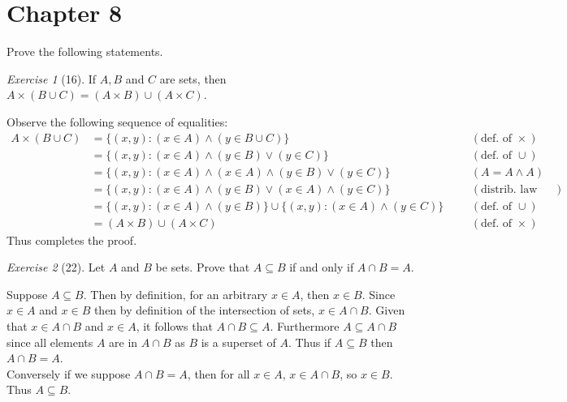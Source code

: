 \documentclass[12pt]{amsart}
\makeatletter
\theoremstyle{remark}
\newtheorem*{exercise}{Exercise}%
\renewenvironment{proof}[1][\proofname]{\par\doublespacing
  \pushQED{\qed}%
  \normalfont \topsep6\p@\@plus6\p@\relax
  \list{}{%
    \settowidth{\leftmargin}{\itshape\proofname:\hskip\labelsep}%
    \setlength{\labelwidth}{0pt}%
    \setlength{\itemindent}{-\leftmargin}%
  }%
  \item[\hskip\labelsep\itshape#1\@addpunct{:}]\ignorespaces
}{%
  \popQED\endlist\@endpefalse
  \singlespacing
}
\theoremstyle{mycomment}
\makeatother
\begin{document}
\thispagestyle{fancy}

\section*{Chapter 8} Prove the following statements.
\begin{exercise}[16] If $A,B$ and $C$ are sets, then $A\times (B\cup C)=(A\times B)\cup (A\times C)$.
\begin{proof} Observe the following sequence of equalities:
  \begin{align*}
    A \times (B \cup C) & = \{(x,y):(x \in A) \land (y \in B \cup C)\} &&& (\text{def. of } \times)  \\
                        & = \{(x,y):(x \in A) \land (y \in B) \lor (y \in C)\} &&& (\text{def. of } \cup)\\
                        & = \{(x,y):(x \in A) \land (x \in A) \land ( y \in B) \lor (y \in C)\} &&& (A = A \land A) \\
                        & = \{(x,y):(x \in A) \land (y \in B) \lor (x \in A) \land (y \in C)\} &&&  (\text{distrib. law for sets})\\ %
                        & = \{(x,y):(x \in A) \land (y  \in B)\} \cup \{(x,y): (x \in A) \land (y \in C)\} &&& (\text{def. of } \cup)\\
                        & = (A \times B) \cup (A \times C) &&& (\text{def. of } \times)
  \end{align*}
  Thus completes the proof.
\end{proof}
\end{exercise}
\begin{exercise}[22] Let $A$ and $B$ be sets. Prove that $A\subseteq B$ if and only if $A\cap B=A$.
\begin{proof}%
Suppose $A \subseteq B$. Then by definition, for an arbitrary $x \in A$, then $x \in B$. Since $x \in A$ and $x \in B$ then by definition of the intersection of sets, $x \in A \cap B$. Given that $x \in A \cap B$ and $x \in A$, it follows that $A \cap B \subseteq A$. Furthermore $A \subseteq A \cap B$ since all elements $A$ are in $A \cap B$ as $B$ is a superset of $A$. Thus if $A \subseteq B$ then $A \cap B = A$. \\
Conversely if we suppose $A \cap B = A$, then for all $x \in A$, $x \in A \cap B$, so $x \in B$. Thus $ A \subseteq B$. 
\end{proof}
\end{exercise}
\end{document}
